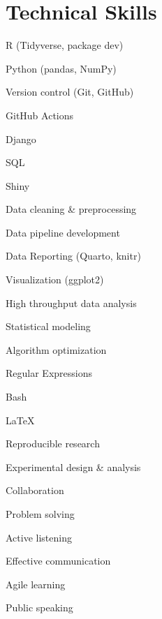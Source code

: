\documentclass{resume}
\begin{document}
    \section{Technical Skills}
            \begin{skills}
                \item R (Tidyverse, package dev)
                \item Python (pandas, NumPy)
                \item Version control (Git, GitHub)
                \item GitHub Actions
                \item Django
                \item SQL
                \item Shiny
                \item Data cleaning \& preprocessing
                \item Data pipeline development
                \item Data Reporting (Quarto, knitr)
                \item Visualization (ggplot2)
                \item High throughput data analysis
                \item Statistical modeling
                \item Algorithm optimization
                \item Regular Expressions
                \item Bash
                \item \LaTeX
                \item Reproducible research
                \item Experimental design \& analysis
            \end{skills}

            \begin{skills}
                \item Collaboration
                \item Problem solving
                \item Active listening
                \item Effective communication
                \item Agile learning
                \item Public speaking
            \end{skills}
\end{document}
